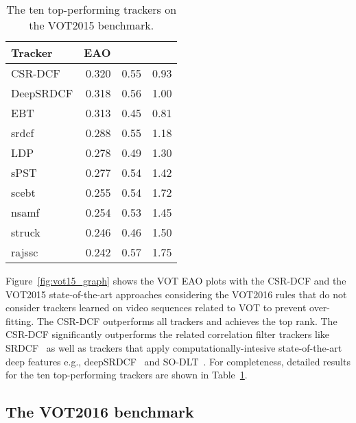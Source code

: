 \documentclass[twocolumn]{article}
\newcommand*\circledd[1]{\tikz[baseline=(char.base)]{
            \node[shape=circle,draw,inner sep=0.15pt] (char) {#1};}}
\newcommand{\first}[1]{{\raisebox{0.8pt}{\footnotesize \color{gold} \circledd{1}}\hspace{3.5pt}#1}}
\newcommand{\second}[1]{{\raisebox{0.8pt}{\footnotesize \color{silver} \circledd{2}}\hspace{3.5pt}#1}}
\newcommand{\third}[1]{{\raisebox{0.8pt}{\footnotesize \color{bronze} \circledd{3}}\hspace{3.5pt}#1}}
\newcommand{\first}[1]{\bf{\color{red}#1}}
\newcommand{\second}[1]{\em{\color{blue}#1}}
\newcommand{\third}[1]{{\color{green}#1}}
\begin{document}
\begin{table}[!t]\setlength{\tabcolsep}{8pt}
\begin{center}
\caption{The ten top-performing trackers on the VOT2015 benchmark.}
\label{tab:detail-vot15}
\begin{tabular*}{0.9\linewidth}{l r r r}
\hline
Tracker & EAO &  &  \\ 
\hline
CSR-DCF & \first{0.320} & \third{0.55} & \second{0.93} \\ 
DeepSRDCF & \second{0.318} & \second{0.56} & \third{1.00} \\ 
EBT & \third{0.313} & 0.45 & \first{0.81} \\ 
srdcf & 0.288 & \third{0.55} & 1.18 \\ 
LDP & 0.278 & 0.49 & 1.30 \\ 
sPST & 0.277 & 0.54 & 1.42 \\ 
scebt & 0.255 & 0.54 & 1.72 \\ 
nsamf & 0.254 & 0.53 & 1.45 \\ 
struck & 0.246 & 0.46 & 1.50 \\ 
rajssc & 0.242 & \first{0.57} & 1.75 \\ 
\hline
\end{tabular*}
\end{center}
\end{table}

Figure~\ref{fig:vot15_graph} shows the VOT EAO plots with the CSR-DCF and the VOT2015 state-of-the-art approaches considering the VOT2016 rules that do not consider trackers learned on video sequences related to VOT to prevent over-fitting. The CSR-DCF outperforms all trackers and achieves the top rank. The CSR-DCF significantly outperforms the related correlation filter trackers like SRDCF~\citep{srdcf_iccv2015} as well as trackers that apply computationally-intesive state-of-the-art deep features e.g., deepSRDCF~\citep{danelljan_iccv2015_convolutional} and SO-DLT~\citep{wang_sodlt}. For completeness, detailed results for the ten top-performing trackers are shown in Table~\ref{tab:detail-vot15}.

\subsection{The VOT2016 benchmark~\citep{kristan_vot2016}} \label{sec:vot_2016}  
\end{document}
